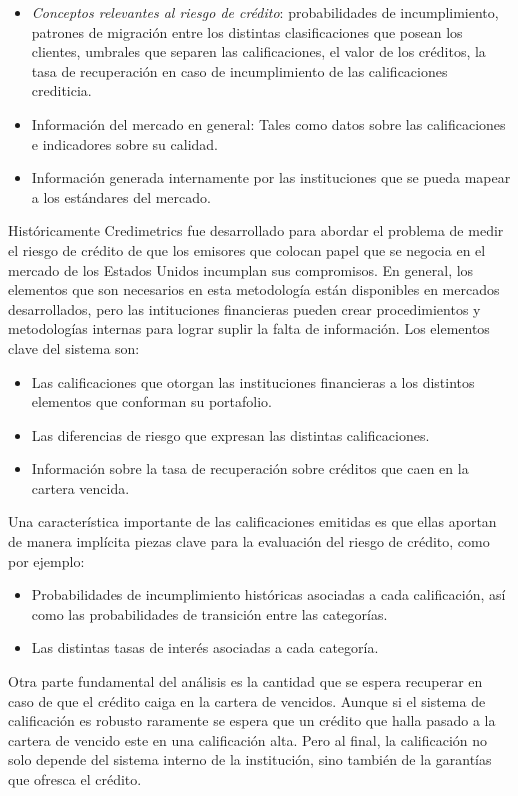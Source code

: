 \documentclass[
  12pt,
]{krantz}
\theoremstyle{definition}
\theoremstyle{definition}
\theoremstyle{definition}
\theoremstyle{remark}
\begin{document}
\begin{itemize}
\item
  \emph{Conceptos relevantes al riesgo de crédito}: probabilidades de incumplimiento, patrones de migración entre los distintas clasificaciones que posean los clientes, umbrales que separen las calificaciones, el valor de los créditos, la tasa de recuperación en caso de incumplimiento de las calificaciones crediticia.
\item
  Información del mercado en general: Tales como datos sobre las calificaciones e indicadores sobre su calidad.
\item
  Información generada internamente por las instituciones que se pueda mapear a los estándares del mercado.
\end{itemize}

Históricamente Credimetrics fue desarrollado para abordar el problema de medir el riesgo de crédito de que los emisores que colocan papel que se negocia en el mercado de los Estados Unidos incumplan sus compromisos. En general, los elementos que son necesarios en esta metodología están disponibles en mercados desarrollados, pero las intituciones financieras pueden crear procedimientos y metodologías internas para lograr suplir la falta de información. Los elementos clave del sistema son:

\begin{itemize}
\item
  Las calificaciones que otorgan las instituciones financieras a los distintos elementos que conforman su portafolio.
\item
  Las diferencias de riesgo que expresan las distintas calificaciones.
\item
  Información sobre la tasa de recuperación sobre créditos que caen en la cartera vencida.
\end{itemize}

Una característica importante de las calificaciones emitidas es que ellas aportan de manera implícita piezas clave para la evaluación del riesgo de crédito, como por ejemplo:

\begin{itemize}
\item
  Probabilidades de incumplimiento históricas asociadas a cada calificación, así como las probabilidades de transición entre las categorías.
\item
  Las distintas tasas de interés asociadas a cada categoría.
\end{itemize}

Otra parte fundamental del análisis es la cantidad que se espera recuperar en caso de que el crédito caiga en la cartera de vencidos. Aunque si el sistema de calificación es robusto raramente se espera que un crédito que halla pasado a la cartera de vencido este en una calificación alta. Pero al final, la calificación no solo depende del sistema interno de la institución, sino también de la garantías que ofresca el crédito.
\end{document}
